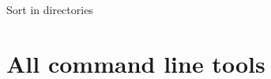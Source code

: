 \documentclass[xcolor={table,dvipsnames}]{beamer}
\begin{document}
\begin{frame}{Sort in directories}
\begin{minipage}[t]{.34\textwidth}
  \end{minipage}%
\end{frame}

\section{All command line tools}
\end{document}
